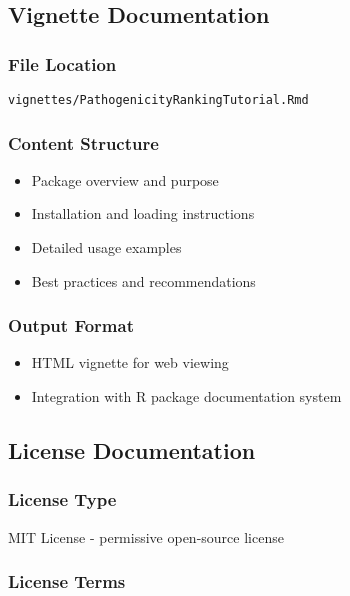 \documentclass[
  11pt,
]{article}
\providecommand{\tightlist}{%
  \setlength{\itemsep}{0pt}\setlength{\parskip}{0pt}}
\begin{document}
\subsection{Vignette Documentation}\label{vignette-documentation}

\subsubsection{File Location}\label{file-location}

\texttt{vignettes/PathogenicityRankingTutorial.Rmd}

\subsubsection{Content Structure}\label{content-structure}

\begin{itemize}
\tightlist
\item
  Package overview and purpose
\item
  Installation and loading instructions
\item
  Detailed usage examples
\item
  Best practices and recommendations
\end{itemize}

\subsubsection{Output Format}\label{output-format}

\begin{itemize}
\tightlist
\item
  HTML vignette for web viewing
\item
  Integration with R package documentation system
\end{itemize}

\subsection{License Documentation}\label{license-documentation}

\subsubsection{License Type}\label{license-type}

MIT License - permissive open-source license

\subsubsection{License Terms}\label{license-terms}
\end{document}
